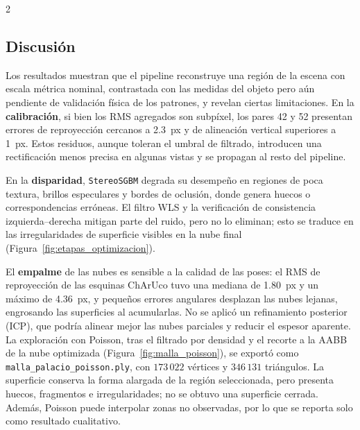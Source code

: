 \documentclass[10pt,a4paper]{article}
\begin{document}
\begin{multicols}{2}
\subsection{Discusión}
\label{sec:discusion}

Los resultados muestran que el pipeline reconstruye una región de la escena con
escala métrica nominal, contrastada con las medidas del objeto pero aún pendiente de
validación física de los patrones, y revelan ciertas limitaciones. En la
\textbf{calibración}, si bien los RMS agregados son subpíxel, los pares 42 y 52 presentan
errores de reproyección cercanos a 2.3~px y de alineación vertical superiores a 1~px.
Estos residuos, aunque toleran el umbral de filtrado, introducen una rectificación menos
precisa en algunas vistas y se propagan al resto del pipeline.

En la \textbf{disparidad}, \texttt{StereoSGBM} degrada su desempeño en regiones de poca
textura, brillos especulares y bordes de oclusión, donde genera huecos o correspondencias
erróneas. El filtro WLS y la verificación de consistencia izquierda--derecha mitigan parte
del ruido, pero no lo eliminan; esto se traduce en las irregularidades de superficie visibles
en la nube final (Figura~\ref{fig:etapas_optimizacion}).

El \textbf{empalme} de las nubes es sensible a la calidad de las poses: el RMS de reproyección
de las esquinas ChArUco tuvo una mediana de 1.80~px y un máximo de 4.36~px, y pequeños errores
angulares desplazan las nubes lejanas, engrosando las superficies al acumularlas. No se aplicó
un refinamiento posterior (ICP), que podría alinear mejor las nubes parciales y reducir el
espesor aparente. La exploración con Poisson, tras el filtrado por densidad y el recorte a la AABB de la nube
optimizada (Figura~\ref{fig:malla_poisson}), se exportó como
\texttt{malla\_palacio\_poisson.ply}, con $173\,022$ vértices y $346\,131$ triángulos.
La superficie conserva la forma alargada de la región
seleccionada, pero presenta huecos, fragmentos e irregularidades; no se obtuvo una superficie
cerrada. Además, Poisson puede interpolar zonas no observadas, por lo que se reporta solo como
resultado cualitativo.


\end{multicols}
\end{document}
